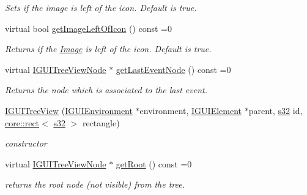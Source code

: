 \begin{DoxyCompactItemize}
\begin{DoxyCompactList}\small\item\em Sets if the image is left of the icon. Default is true. \end{DoxyCompactList}\item 
\mbox{\label{classirr_1_1gui_1_1IGUITreeView_a337b850f96abaecf7dae44f810f3bbed}} 
virtual bool \hyperlink{classirr_1_1gui_1_1IGUITreeView_a337b850f96abaecf7dae44f810f3bbed}{get\+Image\+Left\+Of\+Icon} () const =0
\begin{DoxyCompactList}\small\item\em Returns if the \hyperlink{classImage}{Image} is left of the icon. Default is true. \end{DoxyCompactList}\item 
virtual \hyperlink{classirr_1_1gui_1_1IGUITreeViewNode}{I\+G\+U\+I\+Tree\+View\+Node} $\ast$ \hyperlink{classirr_1_1gui_1_1IGUITreeView_acddfaf6a9b418100d0ec42df52874765}{get\+Last\+Event\+Node} () const =0
\begin{DoxyCompactList}\small\item\em Returns the node which is associated to the last event. \end{DoxyCompactList}\item 
\mbox{\label{classirr_1_1gui_1_1IGUITreeView_a43d973d611542ad77c659167f14aae0d}} 
\hyperlink{classirr_1_1gui_1_1IGUITreeView_a43d973d611542ad77c659167f14aae0d}{I\+G\+U\+I\+Tree\+View} (\hyperlink{classirr_1_1gui_1_1IGUIEnvironment}{I\+G\+U\+I\+Environment} $\ast$environment, \hyperlink{classirr_1_1gui_1_1IGUIElement}{I\+G\+U\+I\+Element} $\ast$parent, \hyperlink{namespaceirr_ac66849b7a6ed16e30ebede579f9b47c6}{s32} id, \hyperlink{classirr_1_1core_1_1rect}{core\+::rect}$<$ \hyperlink{namespaceirr_ac66849b7a6ed16e30ebede579f9b47c6}{s32} $>$ rectangle)
\begin{DoxyCompactList}\small\item\em constructor \end{DoxyCompactList}\item 
\mbox{\label{classirr_1_1gui_1_1IGUITreeView_ad423c84a07a969c786902bf29d736033}} 
virtual \hyperlink{classirr_1_1gui_1_1IGUITreeViewNode}{I\+G\+U\+I\+Tree\+View\+Node} $\ast$ \hyperlink{classirr_1_1gui_1_1IGUITreeView_ad423c84a07a969c786902bf29d736033}{get\+Root} () const =0
\begin{DoxyCompactList}\small\item\em returns the root node (not visible) from the tree. \end{DoxyCompactList}\item 

\end{DoxyCompactItemize}
